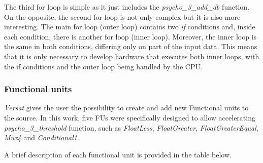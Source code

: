 The third for loop is simple as it just includes the \textit{psycho\_3\_add\_db} function. 
On the opposite, the second for loop is not only complex but it is also more interesting. The main for loop (outer loop) contains two \textit{if} conditions and, inside each condition, there is another for loop (inner loop). Moreover, the inner loop is the same in both conditions, differing only on part of the input data. This means that it is only necessary to develop hardware that executes both inner loops, with the if conditions and the outer loop being handled by the CPU.

\subsubsection{Functional units}
\textit{Versat} gives the user the possibility to create and add new Functional units to the source. In this work, five FUs were specifically designed to allow accelerating \textit{psycho\_3\_threshold} function, such as \textit{FloatLess}, \textit{FloatGreater}, \textit{FloatGreaterEqual}, \textit{Mux4} and \textit{Conditional1}.

A brief description of each functional unit is provided in the table below.

\vspace{0.5cm}

